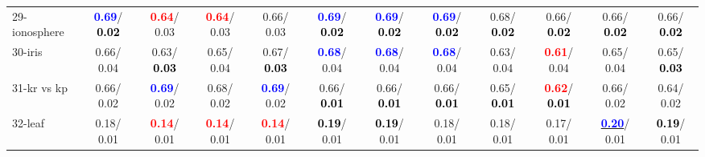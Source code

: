 \begin{table}[h]
\begin{center}
{\begin{tabular}{lc|c|c|c|c|c|c|c|c|c|c}
29-ionosphere & \textcolor{blue}{\textbf{  0.69}}/\textcolor{black}{\textbf{  0.02}} & \textcolor{red}{\textbf{  0.64}}/  0.03 & \textcolor{red}{\textbf{  0.64}}/  0.03 &   0.66/  0.03 & \textcolor{blue}{\textbf{  0.69}}/\textcolor{black}{\textbf{  0.02}} & \textcolor{blue}{\textbf{  0.69}}/\textcolor{black}{\textbf{  0.02}} & \textcolor{blue}{\textbf{  0.69}}/\textcolor{black}{\textbf{  0.02}} &   0.68/\textcolor{black}{\textbf{  0.02}} &   0.66/\textcolor{black}{\textbf{  0.02}} &   0.66/\textcolor{black}{\textbf{  0.02}} &   0.66/\textcolor{black}{\textbf{  0.02}} \\
30-iris &   0.66/  0.04 &   0.63/\textcolor{black}{\textbf{  0.03}} &   0.65/  0.04 &   0.67/\textcolor{black}{\textbf{  0.03}} & \textcolor{blue}{\textbf{  0.68}}/  0.04 & \textcolor{blue}{\textbf{  0.68}}/  0.04 & \textcolor{blue}{\textbf{  0.68}}/  0.04 &   0.63/  0.04 & \textcolor{red}{\textbf{  0.61}}/  0.04 &   0.65/  0.04 &   0.65/\textcolor{black}{\textbf{  0.03}} \\
31-kr vs kp &   0.66/  0.02 & \textcolor{blue}{\textbf{  0.69}}/  0.02 &   0.68/  0.02 & \textcolor{blue}{\textbf{  0.69}}/  0.02 &   0.66/\textcolor{black}{\textbf{  0.01}} &   0.66/\textcolor{black}{\textbf{  0.01}} &   0.66/\textcolor{black}{\textbf{  0.01}} &   0.65/\textcolor{black}{\textbf{  0.01}} & \textcolor{red}{\textbf{  0.62}}/\textcolor{black}{\textbf{  0.01}} &   0.66/  0.02 &   0.64/  0.02 \\
32-leaf &   0.18/  0.01 & \textcolor{red}{\textbf{  0.14}}/  0.01 & \textcolor{red}{\textbf{  0.14}}/  0.01 & \textcolor{red}{\textbf{  0.14}}/  0.01 & \textcolor{black}{\textbf{  0.19}}/  0.01 & \textcolor{black}{\textbf{  0.19}}/  0.01 &   0.18/  0.01 &   0.18/  0.01 &   0.17/  0.01 & \underline{\textcolor{blue}{\textbf{  0.20}}}/  0.01 & \textcolor{black}{\textbf{  0.19}}/  0.01 \\\end{tabular}
}\label{strats0bCIELM}
\end{center}
\end{table}
